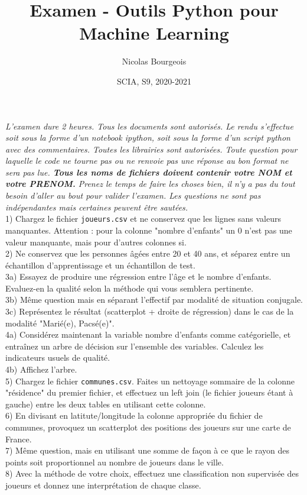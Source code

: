 \documentclass[11pt]{article}
\title{Examen - Outils Python pour Machine Learning}
\author{Nicolas Bourgeois}
\date{SCIA, S9, 2020-2021}
\begin{document}
\maketitle

\textit{L'examen dure 2 heures. Tous les documents sont autorisés. Le rendu s'effectue soit sous la forme d'un notebook ipython, soit sous la forme d'un script python avec des commentaires. Toutes les librairies sont autorisées. Toute question pour laquelle le code ne tourne pas ou ne renvoie pas une réponse au bon format ne sera pas lue. \textbf{Tous les noms de fichiers doivent contenir votre NOM et votre PRENOM.} Prenez le temps de faire les choses bien, il n'y a pas du tout besoin d'aller au bout pour valider l'examen. Les questions ne sont pas indépendantes mais certaines peuvent être sautées.}\\

1) Chargez le fichier \texttt{joueurs.csv} et ne conservez que les lignes sans valeurs manquantes. Attention : pour la colonne "nombre d'enfants" un 0 n'est pas une valeur manquante, mais pour d'autres colonnes si.\\

2) Ne conservez que les personnes âgées entre 20 et 40 ans, et séparez entre un échantillon d'apprentissage et un échantillon de test.\\

3a) Essayez de produire une régression entre l'âge et le nombre d'enfants. Evaluez-en la qualité selon la méthode qui vous semblera pertinente.\\

3b) Même question mais en séparant l'effectif par modalité de situation conjugale.\\

3c) Représentez le résultat (scatterplot + droite de régression) dans le cas de la modalité "Marié(e), Pacsé(e)".\\

4a) Considérez maintenant la variable nombre d'enfants comme catégorielle, et entraînez un arbre de décision sur l'ensemble des variables. Calculez les indicateurs usuels de qualité.\\

4b) Affichez l'arbre.\\

5) Chargez le fichier \texttt{communes.csv}. Faites un nettoyage sommaire de la colonne "résidence" du premier fichier, et effectuez un left join (le fichier joueurs étant à gauche) entre les deux tables en utilisant cette colonne.\\

6) En divisant en latitute/longitude la colonne appropriée du fichier de communes, provoquez un scatterplot des positions des joueurs sur une carte de France.\\

7) Même question, mais en utilisant une somme de façon à ce que le rayon des points soit proportionnel au nombre de joueurs dans le ville.\\

8) Avec la méthode de votre choix, effectuez une classification non supervisée des joueurs et donnez une interprétation de chaque classe.
\end{document}
